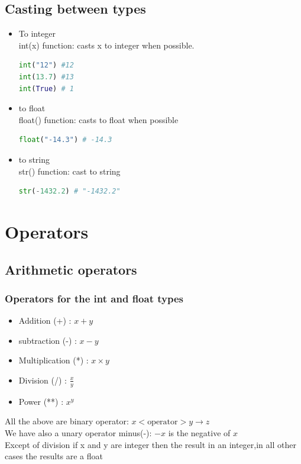 \documentclass[12pt,oneside]{book}
\begin{document}
\subsection{Casting between types}
\begin{itemize}
	\item To integer\\
	      int(x) function: casts x to integer when possible.
	      \begin{lstlisting}[language=python]
int("12") #12
int(13.7) #13
int(True) # 1
\end{lstlisting}
	\item to float \\
	      float() function: casts to float when possible
	      \begin{lstlisting}[language=python]
float("-14.3") # -14.3 
\end{lstlisting}
	\item to string \\
	      str() function: cast to string
	      \begin{lstlisting}[language=python]
str(-1432.2) # "-1432.2"
\end{lstlisting}
\end{itemize}

\section{Operators}
\subsection{Arithmetic operators}
\subsubsection{Operators for the int and float types}
\begin{itemize}
	\item Addition (+) : $x+y$
	\item subtraction (-) : $x-y$
	\item Multiplication (*) : $x\times y$
	\item Division (/) : $\frac{x}{y}$
	\item Power (**) : $x^y$
\end{itemize}
All the above are binary operator: $x <\text{operator}> y \to z$\\
We have also a unary operator minus(-): $-x$ is the negative of $x$\\
Except of division if x and y are integer then the result in an integer,in all other cases the results are a float
\end{document}
